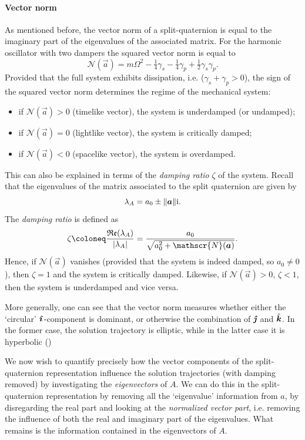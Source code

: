 \paragraph{Vector norm}
As mentioned before, the vector norm of a split-quaternion is equal to the imaginary part of the eigenvalues of the associated matrix. For the harmonic oscillator with two dampers the squared vector norm is equal to 
$$ \mathscr{N}(\vec{a}) = m\Omega^2 - \tfrac{1}{4}\gamma_s - \tfrac{1}{4}\gamma_p + \tfrac{1}{2}\gamma_s \gamma_p. $$
Provided that the full system exhibits dissipation, i.e. ($\gamma_s + \gamma_p > 0$), the sign of the squared vector norm determines the regime of the mechanical system:
\begin{itemize}
    \item if $\mathscr{N}(\vec{a}) > 0$ (timelike vector), the system is underdamped (or undamped); 
    \item if $\mathscr{N}(\vec{a}) = 0$ (lightlike vector), the system is critically damped; 
    \item if $\mathscr{N}(\vec{a}) < 0$ (spacelike vector), the system is overdamped.
\end{itemize}
This can also be explained in terms of the \emph{damping ratio} $\zeta$ of the system. Recall that the eigenvalues of the matrix associated to the split quaternion are given by
\begin{equation}
    \lambda_A = a_0 \pm \norm{\vec{a}}\ii.
\end{equation}
The \emph{damping ratio} is defined as
\begin{equation}
    \zeta \coloneq \frac{\Re(\lambda_A)}{\abs{\lambda_A}} = \frac{a_0}{\sqrt{a_0^2 + \mathscr{N}(\vec{a})}}.
\end{equation}
Hence, if $\mathscr{N}(\vec{a})$ vanishes (provided that the system is indeed damped, so $a_0 \neq 0$), then $\zeta = 1$ and the system is critically damped. Likewise, if $\mathscr{N}(\vec{a}) > 0$, $\zeta < 1$, then the system is underdamped and vice versa.

More generally, one can see that the vector norm measures whether either the `circular' $\quati$-component is dominant, or otherwise the combination of $\quatj$ and $\quatk$. In the former case, the solution trajectory is elliptic, while in the latter case it is hyperbolic ()

We now wish to quantify precisely how the vector components of the split-quaternion representation influence the solution trajectories (with damping removed) by investigating the \emph{eigenvectors} of $A$. We can do this in the split-quaternion representation by removing all the `eigenvalue' information from $a$, by disregarding the real part and looking at the \emph{normalized vector part}, i.e. removing the influence of both the real and imaginary part of the eigenvalues. What remains is the information contained in the eigenvectors of $A$.

